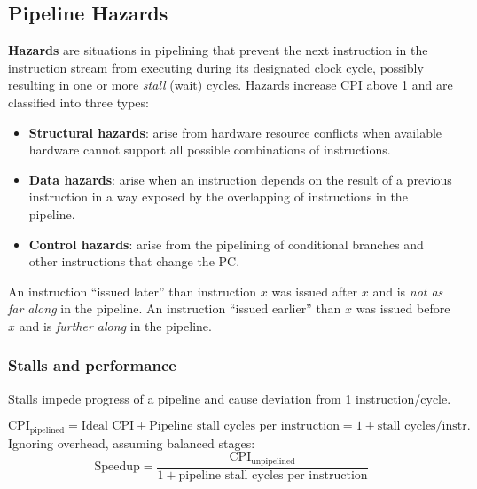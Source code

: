 \subsection{Pipeline Hazards}

\begin{definition}
\textbf{Hazards} are situations in pipelining that prevent the next
instruction in the instruction stream from executing during its designated
clock cycle, possibly resulting in one or more \emph{stall} (wait) cycles.
Hazards increase CPI above 1 and are classified into three types:

\begin{itemize}
  \item \textbf{Structural hazards}: arise from hardware resource conflicts
  when available hardware cannot support all possible combinations of
  instructions.
  \item \textbf{Data hazards}: arise when an instruction depends on the
  result of a previous instruction in a way exposed by the overlapping of
  instructions in the pipeline.
  \item \textbf{Control hazards}: arise from the pipelining of conditional
  branches and other instructions that change the PC.
\end{itemize}
\end{definition}

\begin{note}
An instruction ``issued later'' than instruction $x$
was issued after $x$ and is \emph{not as far along} in the pipeline. An
instruction ``issued earlier'' than $x$ was issued before $x$ and is
\emph{further along} in the pipeline.
\end{note}

\subsubsection{Stalls and performance}

Stalls impede progress of a pipeline and cause deviation from 1
instruction/cycle.
\begin{prop}
\[
  \mathrm{CPI}_{\text{pipelined}} = \text{Ideal CPI} + \text{Pipeline stall cycles per instruction} = 1 + \text{stall cycles/instr.}
\]
Ignoring overhead, assuming balanced stages:
\[
  \text{Speedup} = \frac{\mathrm{CPI}_{\text{unpipelined}}}{1 + \text{pipeline stall cycles per instruction}}
\]
\end{prop}

